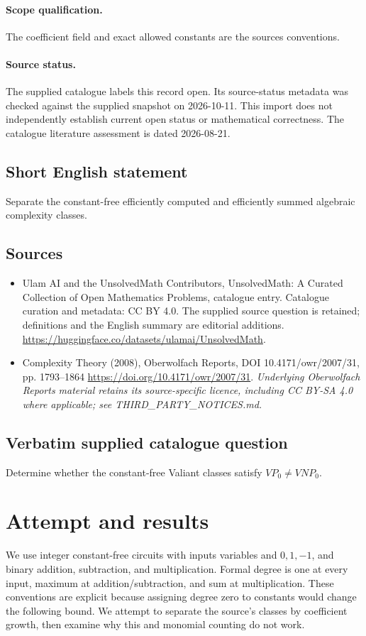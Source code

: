 \documentclass[11pt]{article}
\begin{document}
\paragraph{Scope qualification.}
The coefficient field and exact allowed constants are the source\textquotesingle s conventions.
\paragraph{Source status.}
The supplied catalogue labels this record open. Its source-status metadata was checked against the supplied snapshot on 2026-10-11. This import does not independently establish current open status or mathematical correctness. The catalogue literature assessment is dated 2026-08-21.
\subsection{Short English statement}
Separate the constant-free efficiently computed and efficiently summed algebraic complexity classes.
\subsection{Sources}
\begin{itemize}
\item[S1] Ulam AI and the UnsolvedMath Contributors, UnsolvedMath: A Curated Collection of Open Mathematics Problems, catalogue entry. Catalogue curation and metadata: CC BY 4.0. The supplied source question is retained; definitions and the English summary are editorial additions.
\url{https://huggingface.co/datasets/ulamai/UnsolvedMath}.
\item[S2] Complexity Theory (2008), Oberwolfach Reports, DOI 10.4171/owr/2007/31, pp. 1793--1864
\url{https://doi.org/10.4171/owr/2007/31}.
\textit{Underlying Oberwolfach Reports material retains its source-specific licence, including CC BY-SA 4.0 where applicable; see THIRD\_PARTY\_NOTICES.md.}
\end{itemize}
\subsection{Verbatim supplied catalogue question}
Determine whether the constant-free Valiant classes satisfy $VP_0\neq VNP_0$.

\section{Attempt and results}
We use integer constant-free circuits with inputs variables and $0,1,-1$,
and binary addition, subtraction, and multiplication. Formal degree is one
at every input, maximum at addition/subtraction, and sum at multiplication.
These conventions are explicit because assigning degree zero to constants
would change the following bound. We attempt to separate the source's classes
by coefficient growth, then examine why this and monomial counting do not work.
\end{document}

